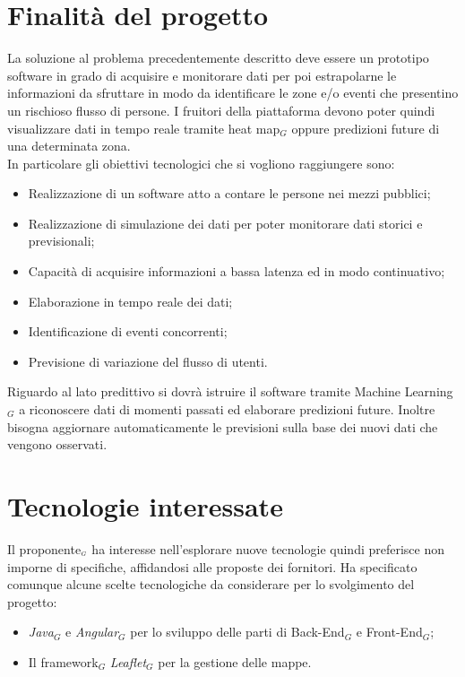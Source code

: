 \section{Finalità del progetto} \label{C3FinalitàDelProgetto}
La soluzione al problema precedentemente descritto deve essere un prototipo software in grado di acquisire e monitorare dati per poi estrapolarne le informazioni da sfruttare in modo da identificare le zone e/o  eventi che presentino un rischioso flusso di persone. I fruitori della piattaforma devono poter quindi visualizzare dati in tempo reale tramite heat map$_G$ oppure predizioni future di una determinata zona. \\
In particolare gli obiettivi tecnologici che si vogliono raggiungere sono:
\begin{itemize}
	\item Realizzazione di un software atto a contare le persone nei mezzi pubblici;
	\item Realizzazione di simulazione dei dati per poter monitorare dati storici e previsionali;
	\item Capacità di acquisire informazioni a bassa latenza ed in modo continuativo;
	\item Elaborazione in tempo reale dei dati;
	\item Identificazione di eventi concorrenti;
	\item Previsione di variazione del flusso di utenti.
\end{itemize}
Riguardo al lato predittivo si dovrà istruire il software tramite Machine Learning$_G$ a riconoscere dati di momenti passati ed elaborare predizioni future. Inoltre bisogna aggiornare automaticamente le previsioni sulla base dei nuovi dati che vengono osservati.
\section{Tecnologie interessate} \label{C3TecnologieInteressate}
Il proponente$_{\scaleto{G}{3pt}}$ ha interesse nell'esplorare nuove tecnologie quindi preferisce non imporne di specifiche, affidandosi alle proposte dei fornitori. Ha specificato comunque alcune scelte tecnologiche da considerare per lo svolgimento del progetto:
\begin{itemize}
	\item \textit{Java}$_G$ e \textit{Angular}$_G$ per lo sviluppo delle parti di Back-End$_G$ e Front-End$_G$;
	\item Il framework$_G$ \textit{Leaflet}$_G$ per la gestione delle mappe.
\end{itemize}
